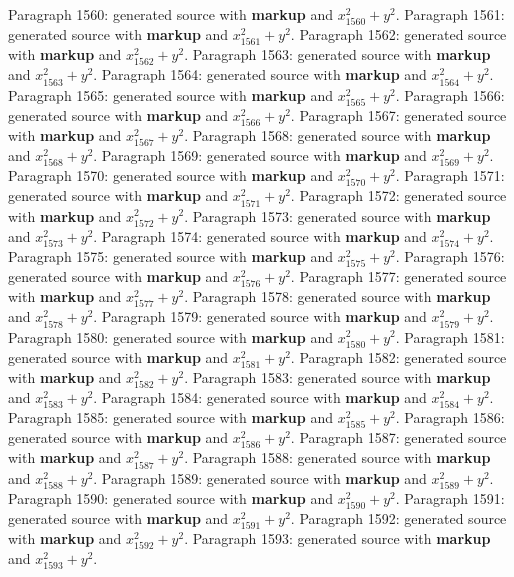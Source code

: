\documentclass{article}
\begin{document}
Paragraph 1560: generated source with \textbf{markup} and $x_{1560}^2 + y^2$.
Paragraph 1561: generated source with \textbf{markup} and $x_{1561}^2 + y^2$.
Paragraph 1562: generated source with \textbf{markup} and $x_{1562}^2 + y^2$.
Paragraph 1563: generated source with \textbf{markup} and $x_{1563}^2 + y^2$.
Paragraph 1564: generated source with \textbf{markup} and $x_{1564}^2 + y^2$.
Paragraph 1565: generated source with \textbf{markup} and $x_{1565}^2 + y^2$.
Paragraph 1566: generated source with \textbf{markup} and $x_{1566}^2 + y^2$.
Paragraph 1567: generated source with \textbf{markup} and $x_{1567}^2 + y^2$.
Paragraph 1568: generated source with \textbf{markup} and $x_{1568}^2 + y^2$.
Paragraph 1569: generated source with \textbf{markup} and $x_{1569}^2 + y^2$.
Paragraph 1570: generated source with \textbf{markup} and $x_{1570}^2 + y^2$.
Paragraph 1571: generated source with \textbf{markup} and $x_{1571}^2 + y^2$.
Paragraph 1572: generated source with \textbf{markup} and $x_{1572}^2 + y^2$.
Paragraph 1573: generated source with \textbf{markup} and $x_{1573}^2 + y^2$.
Paragraph 1574: generated source with \textbf{markup} and $x_{1574}^2 + y^2$.
Paragraph 1575: generated source with \textbf{markup} and $x_{1575}^2 + y^2$.
Paragraph 1576: generated source with \textbf{markup} and $x_{1576}^2 + y^2$.
Paragraph 1577: generated source with \textbf{markup} and $x_{1577}^2 + y^2$.
Paragraph 1578: generated source with \textbf{markup} and $x_{1578}^2 + y^2$.
Paragraph 1579: generated source with \textbf{markup} and $x_{1579}^2 + y^2$.
Paragraph 1580: generated source with \textbf{markup} and $x_{1580}^2 + y^2$.
Paragraph 1581: generated source with \textbf{markup} and $x_{1581}^2 + y^2$.
Paragraph 1582: generated source with \textbf{markup} and $x_{1582}^2 + y^2$.
Paragraph 1583: generated source with \textbf{markup} and $x_{1583}^2 + y^2$.
Paragraph 1584: generated source with \textbf{markup} and $x_{1584}^2 + y^2$.
Paragraph 1585: generated source with \textbf{markup} and $x_{1585}^2 + y^2$.
Paragraph 1586: generated source with \textbf{markup} and $x_{1586}^2 + y^2$.
Paragraph 1587: generated source with \textbf{markup} and $x_{1587}^2 + y^2$.
Paragraph 1588: generated source with \textbf{markup} and $x_{1588}^2 + y^2$.
Paragraph 1589: generated source with \textbf{markup} and $x_{1589}^2 + y^2$.
Paragraph 1590: generated source with \textbf{markup} and $x_{1590}^2 + y^2$.
Paragraph 1591: generated source with \textbf{markup} and $x_{1591}^2 + y^2$.
Paragraph 1592: generated source with \textbf{markup} and $x_{1592}^2 + y^2$.
Paragraph 1593: generated source with \textbf{markup} and $x_{1593}^2 + y^2$.
\end{document}

